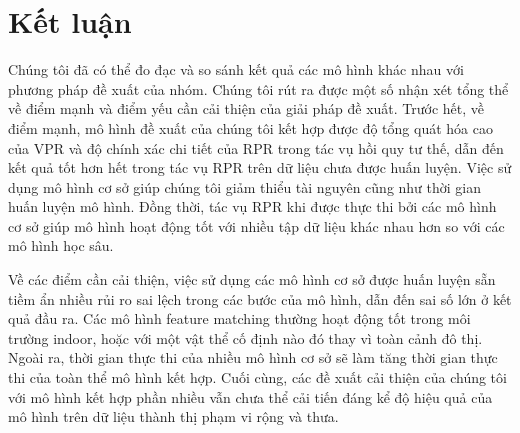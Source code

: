 \section{Kết luận}
Chúng tôi đã có thể đo đạc và so sánh kết quả các mô hình khác nhau với phương pháp đề xuất của nhóm. Chúng tôi rút ra được một số nhận xét tổng thể về điểm mạnh và điểm yếu cần cải thiện của giải pháp đề xuất. Trước hết, về điểm mạnh, mô hình đề xuất của chúng tôi kết hợp được độ tổng quát hóa cao của VPR và độ chính xác chi tiết của RPR trong tác vụ hồi quy tư thế, dẫn đến kết quả tốt hơn hết trong tác vụ RPR trên dữ liệu chưa được huấn luyện. Việc sử dụng mô hình cơ sở giúp chúng tôi giảm thiểu tài nguyên cũng như thời gian huấn luyện mô hình. Đồng thời, tác vụ RPR khi được thực thi bởi các mô hình cơ sở giúp mô hình hoạt động tốt với nhiều tập dữ liệu khác nhau hơn so với các mô hình học sâu.

Về các điểm cần cải thiện, việc sử dụng các mô hình cơ sở được huấn luyện sẵn tiềm ẩn nhiều rủi ro sai lệch trong các bước của mô hình, dẫn đến sai số lớn ở kết quả đầu ra. Các mô hình feature matching thường hoạt động tốt trong môi trường indoor, hoặc với một vật thể cố định nào đó thay vì toàn cảnh đô thị. Ngoài ra, thời gian thực thi của nhiều mô hình cơ sở sẽ làm tăng thời gian thực thi của toàn thể mô hình kết hợp. Cuối cùng, các đề xuất cải thiện của chúng tôi với mô hình kết hợp phần nhiều vẫn chưa thể cải tiến đáng kể độ hiệu quả của mô hình trên dữ liệu thành thị phạm vi rộng và thưa.